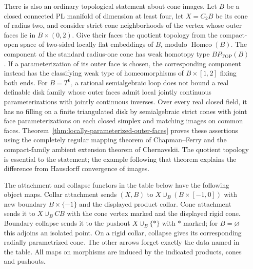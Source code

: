 \documentclass[11pt,a4paper]{article}
\theoremstyle{definition}
\begin{document}
There is also an ordinary topological statement about cone images.
Let $B$ be a closed connected PL manifold of dimension at least four,
let $X=C_2B$ be its cone of radius two, and consider strict cone
neighborhoods of the vertex whose outer faces lie in $B\times(0,2)$.
Give their faces the quotient topology from the compact-open space
of two-sided locally flat embeddings of $B$, modulo
$\operatorname{Homeo}(B)$.  The component of the standard radius-one
cone has weak homotopy type $BP_{\mathrm{TOP}}(B)$.
If a parameterization of its outer face is chosen, the corresponding
component instead has the classifying weak type of homeomorphisms of
$B\times[1,2]$ fixing both ends.  For $B=T^6$, a rational
semialgebraic loop does not bound a real definable disk family whose
outer faces admit local jointly continuous parameterizations with
jointly continuous inverses.  Over every real closed field, it has
no filling on a finite triangulated disk by semialgebraic strict cones
with joint face parameterizations on each closed simplex and matching
images on common faces.  Theorem~\ref{thm:locally-parameterized-outer-faces}
proves these assertions using the completely regular mapping theorem
of Chapman--Ferry and the compact-family ambient extension theorem
of Chernavskii.  The quotient topology is essential to the statement;
the example following that theorem explains the difference from
Hausdorff convergence of images.

The attachment and collapse functors in the table below have the
following object maps. Collar attachment sends $(X,B)$ to
$X\cup_B(B\times[-1,0])$ with new boundary $B\times\{-1\}$ and
the displayed product collar. Cone attachment sends it to
$X\cup_B CB$ with the cone vertex marked and the displayed rigid cone.
Boundary collapse sends it to the pushout $X\cup_B\{*\}$ with $*$
marked; for $B=\varnothing$ this adjoins an isolated point. On a rigid
collar, collapse gives its corresponding radially parametrized cone.
The other arrows forget exactly the data named in the table. All maps
on morphisms are induced by the indicated products, cones and pushouts.
\end{document}
